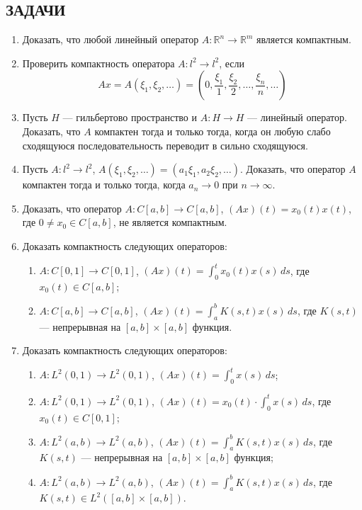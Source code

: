 \documentclass[12pt,a4paper]{article}
\begin{document}
\subsection*{ЗАДАЧИ}
\begin{enumerate}
\item Доказать, что любой линейный оператор $A: \mathbb{R}^{n} \rightarrow \mathbb{R}^{m}$ является компактным.

\item Проверить компактность оператора $A: l^{2} \rightarrow l^{2}$, если
$$ Ax = A(\xi_{1}, \xi_{2}, \dots) = (0, \frac{\xi_{1}}{1}, \frac{\xi_{2}}{2}, \dots, \frac{\xi_{n}}{n}, \dots) $$

\item Пусть $H$ — гильбертово пространство и $A: H \rightarrow H$ — линейный оператор. Доказать, что $A$ компактен тогда и только тогда, когда он любую слабо сходящуюся последовательность переводит в сильно сходящуюся.

\item Пусть $A: l^{2} \rightarrow l^{2}$, $A(\xi_{1}, \xi_{2}, \dots) = (a_{1}\xi_{1}, a_{2}\xi_{2}, \dots)$. Доказать, что оператор $A$ компактен тогда и только тогда, когда $a_{n} \rightarrow 0$ при $n \rightarrow \infty$.

\item Доказать, что оператор $A: C[a,b] \rightarrow C[a,b]$, $(Ax)(t) = x_{0}(t)x(t)$, где $0 \ne x_{0} \in C[a,b]$, не является компактным.

\item Доказать компактность следующих операторов:
\begin{enumerate}[label=\alph*)]
\item $A: C[0,1] \rightarrow C[0,1]$, $(Ax)(t) = \int_{0}^{t} x_{0}(t)x(s) \, ds$, где $x_{0}(t) \in C[a,b]$;
\item $A: C[a,b] \rightarrow C[a,b]$, $(Ax)(t) = \int_{a}^{b} K(s,t)x(s) \, ds$, где $K(s,t)$ — непрерывная на $[a,b] \times [a,b]$ функция.
\end{enumerate}

\item Доказать компактность следующих операторов:
\begin{enumerate}[label=\alph*)]
\item $A: L^{2}(0,1) \rightarrow L^{2}(0,1)$, $(Ax)(t) = \int_{0}^{t} x(s) \, ds$;
\item $A: L^{2}(0,1) \rightarrow L^{2}(0,1)$, $(Ax)(t) = x_{0}(t) \cdot \int_{0}^{t} x(s) \, ds$, где $x_{0}(t) \in C[0,1]$;
\item $A: L^{2}(a,b) \rightarrow L^{2}(a,b)$, $(Ax)(t) = \int_{a}^{b} K(s,t)x(s) \, ds$, где $K(s,t)$ — непрерывная на $[a,b] \times [a,b]$ функция;
\item $A: L^{2}(a,b) \rightarrow L^{2}(a,b)$, $(Ax)(t) = \int_{a}^{b} K(s,t)x(s) \, ds$, где $K(s,t) \in L^{2}([a,b] \times [a,b])$.
\end{enumerate}


\end{enumerate}
\end{document}
